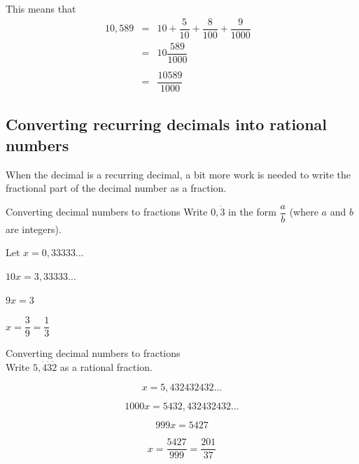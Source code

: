 This means that
\begin{equation*}
 \begin{array}{lll}10,589& = &10 + \dfrac{5}{10} + \dfrac{8}{100} + \dfrac{9}{1000} &\\ 
  &=& 10 \dfrac{589}{1000} \\
\\
&=& \dfrac{10589}{1000}
 \end{array}

\end{equation*}

\subsection{Converting recurring decimals into rational numbers}


When the decimal is a recurring decimal, a bit more work is needed to write the fractional part of the decimal number as a fraction.\par 

\begin{wex}
{%
Converting decimal numbers to fractions
}
{%
Write $0,\dot{3}$ in the form $\dfrac{a}{b}$ (where $a$ and $b$ are integers).
}
{%

Let $x = 0,33333\ldots$



$10x = 3,33333\ldots$



$9x = 3 $


$ x = \dfrac{3}{9} = \dfrac{1}{3} $
}
\end{wex}


\begin{wex}
{%
Converting decimal numbers to fractions
}
{%
\\Write $5,\dot{4}\dot{3}\dot{2}$ as a rational fraction.
}
{%


$$ x = 5,432432432\ldots $$


$$ 1000x = 5432,432432432\ldots $$


$$ 999x = 5427 $$


$$ x = \dfrac{5427}{999} = \dfrac{201}{37} $$

}
\end{wex}




